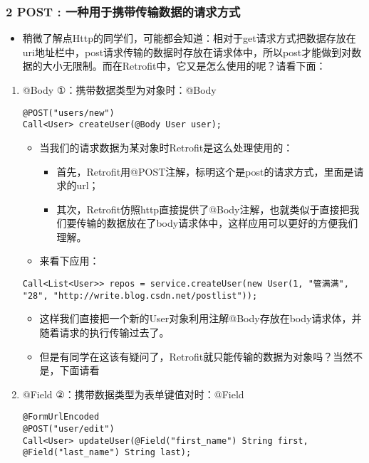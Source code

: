 \documentclass[9pt, b5paper]{article}
\begin{document}
\subsubsection{2 POST : 一种用于携带传输数据的请求方式}
\label{sec-1-2-2}
\begin{itemize}
\item 稍微了解点Http的同学们，可能都会知道：相对于get请求方式把数据存放在uri地址栏中，post请求传输的数据时存放在请求体中，所以post才能做到对数据的大小无限制。而在Retrofit中，它又是怎么使用的呢？请看下面：
\end{itemize}
\begin{enumerate}
\item @Body ①：携带数据类型为对象时：@Body
\label{sec-1-2-2-1}
\begin{verbatim}
@POST("users/new")
Call<User> createUser(@Body User user);
\end{verbatim}
\begin{itemize}
\item 当我们的请求数据为某对象时Retrofit是这么处理使用的：
\begin{itemize}
\item 首先，Retrofit用@POST注解，标明这个是post的请求方式，里面是请求的url；
\item 其次，Retrofit仿照http直接提供了@Body注解，也就类似于直接把我们要传输的数据放在了body请求体中，这样应用可以更好的方便我们理解。
\end{itemize}
\item 来看下应用：
\end{itemize}
\begin{verbatim}
Call<List<User>> repos = service.createUser(new User(1, "管满满", "28", "http://write.blog.csdn.net/postlist"));
\end{verbatim}
\begin{itemize}
\item 这样我们直接把一个新的User对象利用注解@Body存放在body请求体，并随着请求的执行传输过去了。
\item 但是有同学在这该有疑问了，Retrofit就只能传输的数据为对象吗？当然不是，下面请看
\end{itemize}
\item @Field ②：携带数据类型为表单键值对时：@Field
\label{sec-1-2-2-2}
\begin{verbatim}
@FormUrlEncoded
@POST("user/edit")
Call<User> updateUser(@Field("first_name") String first, @Field("last_name") String last);

\end{verbatim}
\end{enumerate}
\end{document}

